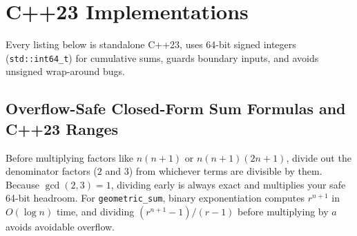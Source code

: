 \documentclass[11pt,a4paper]{article}
\theoremstyle{definition}
\begin{document}
\section{C++23 Implementations}

Every listing below is standalone C++23, uses 64-bit signed integers (\texttt{std::int64\_t}) for cumulative sums, guards boundary inputs, and avoids unsigned wrap-around bugs.

\subsection{Overflow-Safe Closed-Form Sum Formulas and C++23 Ranges}

Before multiplying factors like $n(n + 1)$ or $n(n + 1)(2n + 1)$, divide out the denominator factors ($2$ and $3$) from whichever terms are divisible by them. Because $\gcd(2, 3) = 1$, dividing early is always exact and multiplies your safe 64-bit headroom. For \texttt{geometric\_sum}, binary exponentiation computes $r^{n+1}$ in $O(\log n)$ time, and dividing $(r^{n+1} - 1) / (r - 1)$ before multiplying by $a$ avoids avoidable overflow.
\end{document}

